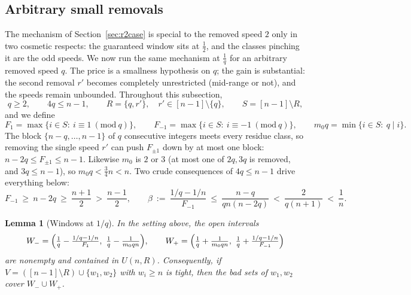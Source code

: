 \documentclass[11pt]{article}
\newtheorem{lemma}[theorem]{Lemma}
\theoremstyle{definition}
\begin{document}
\subsection{Arbitrary small removals}\label{sec:qgeneral}

The mechanism of Section~\ref{sec:r2case} is special to the removed
speed $2$ only in two cosmetic respects: the guaranteed window sits at
$\tfrac12$, and the classes pinching it are the odd speeds.  We now run
the same mechanism at $\tfrac1q$ for an arbitrary removed speed $q$.
The price is a smallness hypothesis on $q$; the gain is substantial: the
second removal $r'$ becomes completely unrestricted (mid-range or not),
and the speeds remain unbounded.  Throughout this subsection,
\[
q\ge2,\qquad 4q\le n-1,\qquad R=\{q,r'\},\quad r'\in[n-1]\setminus\{q\},
\qquad S=[n-1]\setminus R,
\]
and we define
\[
F_{1}=\max\{i\in S:\ i\equiv1\ (\mathrm{mod}\ q)\},\qquad
F_{-1}=\max\{i\in S:\ i\equiv-1\ (\mathrm{mod}\ q)\},\qquad
m_0q=\min\{i\in S:\ q\mid i\}.
\]
The block $\{n-q,\dots,n-1\}$ of $q$ consecutive integers meets every
residue class, so removing the single speed $r'$ can push $F_{\pm1}$
down by at most one block: $n-2q\le F_{\pm1}\le n-1$.  Likewise $m_0$
is $2$ or $3$ (at most one of $2q,3q$ is removed, and $3q\le n-1$), so
$m_0q<\tfrac34n<n$.  Two crude consequences of $4q\le n-1$ drive
everything below:
\begin{equation}\label{eq:qcrude}
F_{-1}\ \ge\ n-2q\ \ge\ \frac{n+1}{2}\ >\ \frac{n-1}{2},
\qquad
\beta\ :=\ \frac{1/q-1/n}{F_{-1}}\ \le\ \frac{n-q}{qn(n-2q)}\
<\ \frac{2}{q(n+1)}\ <\ \frac1n .
\end{equation}

\begin{lemma}[Windows at $1/q$]\label{lem:qwin}
In the setting above, the open intervals
\[
W_-=\Bigl(\tfrac1q-\tfrac{1/q-1/n}{F_{1}},\ \tfrac1q-\tfrac1{m_0qn}\Bigr),
\qquad
W_+=\Bigl(\tfrac1q+\tfrac1{m_0qn},\ \tfrac1q+\tfrac{1/q-1/n}{F_{-1}}\Bigr)
\]
are nonempty and contained in $U(n,R)$.  Consequently, if
$V=([n-1]\setminus R)\cup\{w_1,w_2\}$ with $w_i\ge n$ is tight, then the
bad sets of $w_1,w_2$ cover $W_-\cup W_+$.
\end{lemma}
\end{document}
